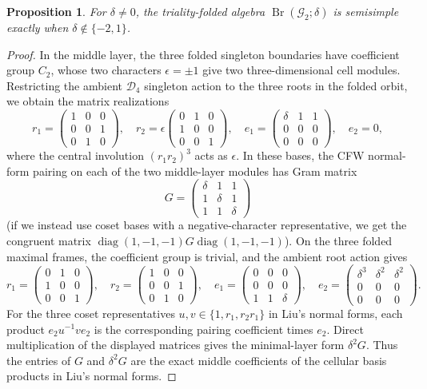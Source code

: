 \documentclass[11pt,a4paper]{amsart}
\newtheorem{proposition}[theorem]{Proposition}
\theoremstyle{uprightdefinition}
\theoremstyle{remark}\newtheorem{remark}[theorem]{Remark}
\begin{document}
\begin{proposition}\label{prop:G2-criterion}
For $\delta\ne0$, the triality-folded algebra
$\operatorname{Br}(\mathscr{G}_2;\delta)$ is semisimple exactly when
$\delta\notin\{-2,1\}$. \end{proposition}
\begin{proof}
In the middle layer, the three folded singleton boundaries have coefficient group $C_2$, whose two characters $\epsilon=\pm1$ give two
three-dimensional cell modules. Restricting the ambient $\mathscr{D}_4$ singleton action to the three roots in the folded orbit, we obtain the matrix realizations
\[
 r_1=\begin{pmatrix}1&0&0\\0&0&1\\0&1&0\end{pmatrix},\quad
 r_2=\epsilon\begin{pmatrix}0&1&0\\1&0&0\\0&0&1\end{pmatrix},\quad
 e_1=\begin{pmatrix}\delta&1&1\\0&0&0\\0&0&0\end{pmatrix},\quad e_2=0,
\]
where the central involution $(r_1r_2)^3$ acts as $\epsilon$. In these bases, the CFW normal-form pairing on each of the two middle-layer modules has Gram matrix
\[
 G=\begin{pmatrix}\delta&1&1\\1&\delta&1\\1&1&\delta\end{pmatrix}
\]
(if we instead use coset bases with a negative-character representative, we get the congruent matrix $\operatorname{diag}(1,-1,-1)G\operatorname{diag}(1,-1,-1)$).
On the three folded maximal frames, the coefficient group is trivial, and the ambient root action gives
\[
 r_1=\begin{pmatrix}0&1&0\\1&0&0\\0&0&1\end{pmatrix},\quad
 r_2=\begin{pmatrix}1&0&0\\0&0&1\\0&1&0\end{pmatrix},\quad
 e_1=\begin{pmatrix}0&0&0\\0&0&0\\1&1&\delta\end{pmatrix},\quad
 e_2=\begin{pmatrix}\delta^3&\delta^2&\delta^2\\0&0&0\\0&0&0\end{pmatrix}.
\]
For the three coset representatives $u,v\in\{1,r_1,r_2r_1\}$ in Liu's normal forms, each product $e_2u^{-1}ve_2$ is the corresponding pairing coefficient times $e_2$. Direct multiplication of the displayed matrices gives the minimal-layer form $\delta^2G$. Thus the entries of $G$ and $\delta^2G$ are the exact middle coefficients of the cellular basis products in Liu's normal forms.


\end{proof}
\end{document}
